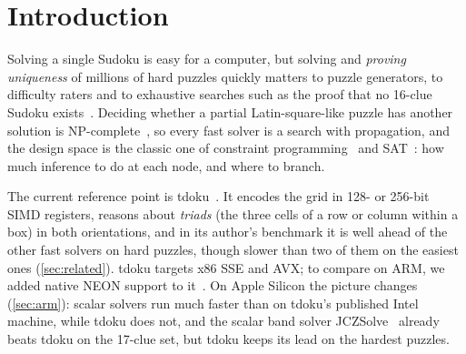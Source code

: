 \documentclass[11pt]{article}
\theoremstyle{definition}
\theoremstyle{plain}
\begin{document}
\begin{abstract}
and about 0.7 times tdoku's speed on Intel Ice Lake and Sapphire Rapids. Hardware counters show why: on x86, tdoku
needs 0.60--0.67 times FastBandSolver's instructions, against 1.29 times on the M4, where its 256-bit operations
become pairs of NEON instructions; on the same x86 binary, Intel cores run tdoku's code faster per cycle than AMD's,
and AVX-512 saves it another 12\% of its cycles. On many cores, running one puzzle per core, FastBandSolver also has the
highest throughput at every core count; a parallel version that splits one puzzle's search between threads solves the
hardest puzzles $2.1\times$ faster on 4 threads. We also report six approaches that did not beat tdoku, with measurements: template (pattern-overlay) search, several search-tree nodes in SIMD lanes, interleaving sibling branches, lookahead
probing, triad rules, and joining band fillings.
\end{abstract}

\section{Introduction}

Solving a single Sudoku is easy for a computer, but solving and \emph{proving uniqueness} of millions of hard
puzzles quickly matters to puzzle generators, to difficulty raters and to exhaustive searches such as the proof
that no 16-clue Sudoku exists~\cite{mcguire2014sixteen}. Deciding whether a partial Latin-square-like puzzle has another
solution is NP-complete~\cite{yato2003complexity}, so every fast solver is a search with propagation, and the design space is
the classic one of constraint programming~\cite{simonis2005sudoku} and SAT~\cite{lynce2006sudoku}: how much inference to do at
each node, and where to branch.

The current reference point is tdoku~\cite{dillon2019tdoku,dillon2019nerdsniped}. It encodes the grid in 128- or
256-bit SIMD registers, reasons about \emph{triads} (the three cells of a row or column within a box) in both
orientations, and in its author's benchmark it is well ahead of the other fast solvers on hard puzzles, though slower than two of them on the easiest ones (\cref{sec:related}). tdoku targets x86 SSE and AVX; to compare on ARM, we added native NEON support
to it~\cite{kelly2026tdokuarm}. On Apple Silicon the picture changes (\cref{sec:arm}): scalar solvers run much faster than on tdoku's published Intel machine, while tdoku does not, and the scalar band solver JCZSolve~\cite{jczsolve2016} already beats tdoku on the
17-clue set, but tdoku keeps its lead on the hardest puzzles.
\end{document}
